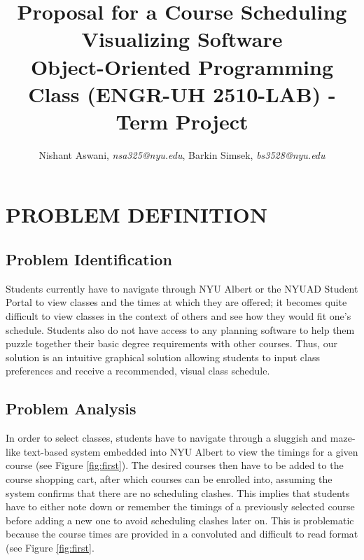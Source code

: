 \documentclass[a4paper, 11.5 pt, conference]{ieeeconf}  %
\title{\LARGE \bf
Proposal for a Course Scheduling Visualizing Software \\
 \large Object-Oriented Programming Class (ENGR-UH 2510-LAB) - Term Project
}
\author{Nishant Aswani, {\it {nsa325@nyu.edu}}, Barkin Simsek, {\it {bs3528@nyu.edu}}}
\begin{document}


\maketitle
%
%


\section{PROBLEM DEFINITION}

\subsection{Problem Identification}

\noindent Students currently have to navigate through NYU Albert or the NYUAD Student Portal to view classes and the times at which they are offered; it becomes quite difficult to view classes in the context of others and see how they would fit one’s schedule. Students also do not have access to any planning software to help them puzzle together their basic degree requirements with other courses. Thus, our solution is an intuitive graphical solution allowing students to input class preferences and receive a recommended, visual class schedule. 


%
%
%
%
%
%
%


\subsection{Problem Analysis}

\noindent In order to select classes, students have to navigate through a sluggish and maze-like text-based system embedded into NYU Albert to view the timings for a given course (see Figure \ref{fig:first}). The desired courses then have to be added to the course shopping cart, after which courses can be enrolled into, assuming the system confirms that there are no scheduling clashes. This implies that students have to either note down or remember the timings of a previously selected course before adding a new one to avoid scheduling clashes later on. This is problematic because the course times are provided in a convoluted and difficult to read format (see Figure \ref{fig:first}. 
\end{document}
